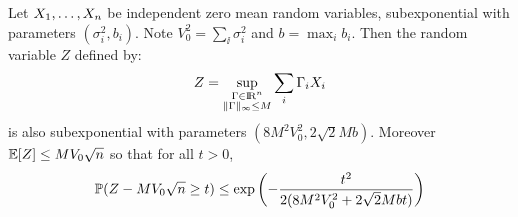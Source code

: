 \begin{proposition}
\label{prop:concentration-subexponential}
Let $X_{1}, \dots, X_{n}$ be independent zero mean random variables, subexponential with parameters $(\sigma_i^2, b_i)$. Note $V_0^2  = \sum_{\ii} \sigma_i^2$ and $b = \max_{i} b_i$. Then the random variable $Z$ defined by:
\begin{equation*}
  Z = \sup_{\substack{\Gamma \in \R^{\n} \\ \|\Gamma \|_{\infty} \leq M}} \sum_{\ii} \Gamma_i X_{\ii}
\end{equation*}
is also subexponential with parameters $(8 M^2 V_0^2, 2\sqrt{2} Mb)$. 
Moreover $\mathbb{E}[Z] \leq M V_0 \sqrt{n}$ so that for all $t > 0$, 
\begin{equation}
  \label{eq:concentration-subexponential}
\Prob( Z - M V_0 \sqrt{n} \geq t) \leq \exp \left( - \frac{t^2}{2 (8M^2 V_0^2 + 2\sqrt{2} M b t)}\right)
\end{equation}

\end{proposition}

